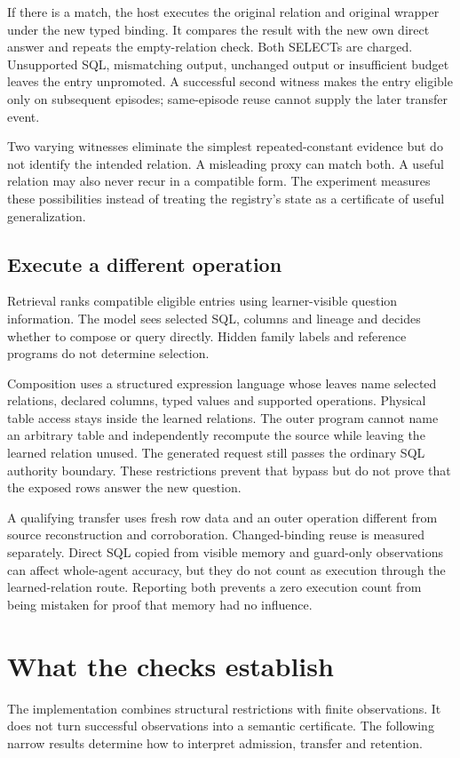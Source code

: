 \documentclass[10pt,twocolumn]{article}
\begin{document}
If there is a match, the host executes the original relation and original
wrapper under the new typed binding. It compares the result with the new own
direct answer and repeats the empty-relation check. Both SELECTs are charged.
Unsupported SQL, mismatching output, unchanged output or insufficient budget
leaves the entry unpromoted. A successful second witness makes the entry
eligible only on subsequent episodes; same-episode reuse cannot supply the
later transfer event.

Two varying witnesses eliminate the simplest repeated-constant evidence but do
not identify the intended relation. A misleading proxy can match both. A useful
relation may also never recur in a compatible form. The experiment measures
these possibilities instead of treating the registry's state as a certificate
of useful generalization.

\subsection{Execute a different operation}
Retrieval ranks compatible eligible entries using learner-visible question
information. The model sees selected SQL, columns and lineage and decides
whether to compose or query directly. Hidden family labels and reference
programs do not determine selection.

Composition uses a structured expression language whose leaves name selected
relations, declared columns, typed values and supported operations. Physical
table access stays inside the learned relations. The outer program cannot name
an arbitrary table and independently recompute the source while leaving the
learned relation unused. The generated request still passes the ordinary SQL
authority boundary. These restrictions prevent that bypass but do not prove
that the exposed rows answer the new question.

A qualifying transfer uses fresh row data and an outer operation different from
source reconstruction and corroboration. Changed-binding reuse is measured
separately. Direct SQL copied from visible memory and guard-only observations
can affect whole-agent accuracy, but they do not count as execution through the
learned-relation route. Reporting both prevents a zero execution count from
being mistaken for proof that memory had no influence.

\section{What the checks establish}
The implementation combines structural restrictions with finite observations.
It does not turn successful observations into a semantic certificate. The
following narrow results determine how to interpret admission, transfer and
retention.
\end{document}
